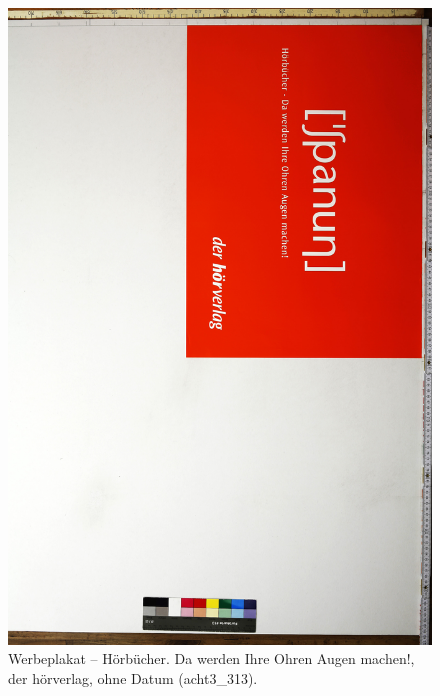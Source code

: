 \documentclass[a4paper,12pt,ngerman]{article}
\begin{document}
\newpage
\begin{landscape}
\begin{figure}[ht]
\includegraphics[height=0.85\linewidth, angle=90]{Abbildung_26_(acht3_313)}
\centering
\caption{Werbeplakat -- Hörbücher. Da werden Ihre Ohren Augen machen!, der hörverlag, ohne Datum (acht3\_313).}
\end{figure}
\end{landscape}
\end{document}
